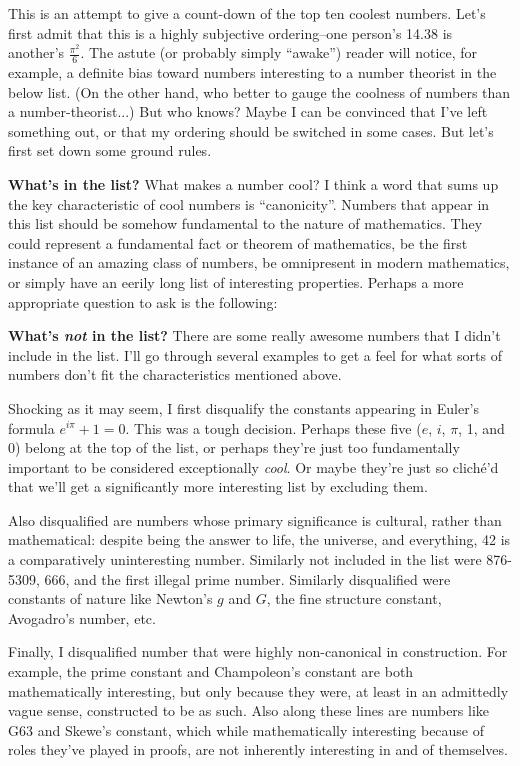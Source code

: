 \documentclass[12pt]{article}
\newcommand{\<}{\langle}
\renewcommand{\>}{\rangle}
\begin{document}
This is an attempt to give a count-down of the top ten coolest
numbers.  Let's first admit that this is a highly subjective
ordering--one person's 14.38 is another's $\frac{\pi^2}{6}$.  The
astute (or probably simply ``awake'') reader will notice, for example,
a definite bias toward numbers interesting to a number theorist in the
below list.  (On the other hand, who better to gauge the coolness of
numbers than a number-theorist...)  But who knows?  Maybe I can be
convinced that I've left something out, or that my ordering should be
switched in some cases.  But let's first set down some ground rules.

\textbf{What's in the list?}  What makes a number cool?  I think a
word that sums up the key characteristic of cool numbers is
``canonicity''.  Numbers that appear in this list should be somehow
fundamental to the nature of mathematics.  They could represent a
fundamental fact or theorem of mathematics, be the first instance of
an amazing class of numbers, be omnipresent in modern mathematics, or
simply have an eerily long list of interesting properties.  Perhaps a
more appropriate question to ask is the following:

\textbf{What's \emph{not} in the list?}  There are some really awesome
numbers that I didn't include in the list.  I'll go through several
examples to get a feel for what sorts of numbers don't fit the
characteristics mentioned above.

Shocking as it may seem, I first disqualify the constants appearing in
Euler's formula $e^{i\pi}+1=0$.  This was a tough decision.  Perhaps
these five ($e$, $i$, $\pi$, 1, and 0) belong at the top of the list, or
perhaps they're just too fundamentally important to be considered
exceptionally \emph{cool}.  Or maybe they're just so clich\'e'd that
we'll get a significantly more interesting list by excluding them.

Also disqualified are numbers whose primary significance is cultural,
rather than mathematical: despite being the answer to life, the
universe, and everything, 42 is a comparatively uninteresting number.  Similarly not included in the list were
876-5309, 666, and the first illegal prime number.  Similarly disqualified were constants of nature like Newton's $g$ and $G$, the fine structure constant, Avogadro's number, etc.

Finally, I disqualified number that were highly non-canonical in
construction.  For example, the prime constant and Champoleon's
constant are both mathematically interesting, but only because they
were, at least in an admittedly vague sense, constructed to be as
such.  Also along these lines are numbers like G63 and Skewe's
constant, which while mathematically interesting because of roles
they've played in proofs, are not inherently interesting in and of
themselves.
\end{document}
